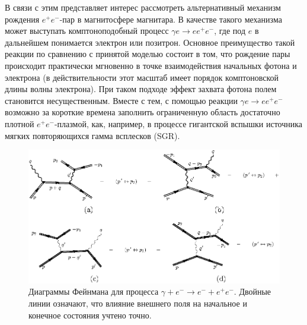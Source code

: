 В связи с этим представляет интерес рассмотреть альтернативный механизм  рождения 
$e^+e^-$-пар в магнитосфере магнитара. В качестве такого механизма может выступать 
комптоноподобный процесс $\gamma e \to e e^+e^-$, где 
под $e$ в дальнейшем понимается электрон или позитрон. 
Основное преимущество такой реакции по сравнению с принятой 
моделью состоит в том, что рождение пары происходит практически мгновенно в точке взаимодействия 
начальных фотона и электрона 
(в действительности этот масштаб имеет порядок комптоновской длины волны электрона). При таком 
подходе эффект захвата фотона полем становится несущественным. 
Вместе с тем, с помощью 
реакции $\gamma e \to e e^+e^-$ возможно за короткие времена заполнить ограниченную область 
 достаточно плотной 
$e^+e^-$-плазмой, как, например, 
в процессе гигантской вспышки источника мягких повторяющихся 
гамма всплесков (SGR).

%
\begin{figure}
\centerline{\includegraphics[width=17cm]{fig5_4.eps}}
\caption{Диаграммы Фейнмана для процесса $\gamma + e^{-} \to e^{-} + e^{+}e^{-}$. 
Двойные линии означают, что влияние внешнего поля на начальное и 
конечное состояния учтено точно.}
\label{fig:Diag}
\end{figure}




